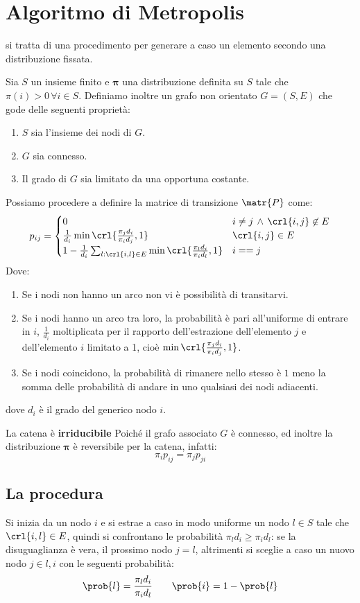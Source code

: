 \documentclass[\main/main.tex]{subfiles}
\begin{document}
\section{Algoritmo di Metropolis}
si tratta di una procedimento per generare a caso un elemento secondo una distribuzione fissata.

Sia \(S\) un insieme finito e \(\bm{\pi} \) una distribuzione definita su \(S\) tale che \(\pi(i) > 0 \, \forall i \in S\). Definiamo inoltre un grafo non orientato \(G = (S, E)\) che gode delle seguenti proprietà:
\begin{enumerate}
  \item \(S\) sia l'insieme dei nodi di \(G\).
  \item \(G\) sia connesso.
  \item Il grado di \(G\) sia limitato da una opportuna costante.
\end{enumerate}

Possiamo procedere a definire la matrice di transizione \(\matr{P}\) come:
\[
  p_{ij} = \begin{cases}
    0                                                                                & i \neq j \, \land \, \crl{i, j} \not\in E \\
    \frac{1}{d_i}\min\crl{\frac{\pi_j d_i}{\pi_i d_j}, 1}                           & \crl{i,j} \in E                           \\
    1-\frac{1}{d_i}\sum_{l:\crl{i,l} \in E}\min\crl{\frac{\pi_l d_i}{\pi_i d_l}, 1} & i==j
  \end{cases}
\]
Dove:
\begin{enumerate}
  \item Se i nodi non hanno un arco non vi è possibilità di transitarvi.
  \item Se i nodi hanno un arco tra loro, la probabilità è pari all'uniforme di entrare in \(i\), \(\frac{1}{d_i}\) moltiplicata per il rapporto dell'estrazione dell'elemento \(j\) e dell'elemento \(i\) limitato a 1, cioè \(\min\crl{\frac{\pi_j d_i}{\pi_i d_j}, 1}\).
  \item Se i nodi coincidono, la probabilità di rimanere nello stesso è \(1\) meno la somma delle probabilità di andare in uno qualsiasi dei nodi adiacenti.
\end{enumerate}
dove \(d_i\) è il grado del generico nodo \(i\).

La catena è \textbf{irriducibile} Poiché il grafo associato \(G\) è connesso, ed inoltre la distribuzione \(\bm{\pi} \) è reversibile per la catena, infatti:
\[
  \pi_i p_{ij} = \pi_j p_{ji}
\]

\subsection{La procedura}
Si inizia da un nodo \(i\) e si estrae a caso in modo uniforme un nodo \(l \in S\) tale che \(\crl{i,l} \in E\), quindi si confrontano le probabilità \(\pi_l d_i \geq \pi_i d_l\): se la disuguaglianza è vera, il prossimo nodo \(j=l\), altrimenti si sceglie a caso un nuovo nodo \(j \in {l, i}\) con le seguenti probabilità:
\[
  \prob{l} = \frac{\pi_l d_i}{\pi_i d_l} \qquad \prob{i} = 1- \prob{l}
\]
\end{document}
